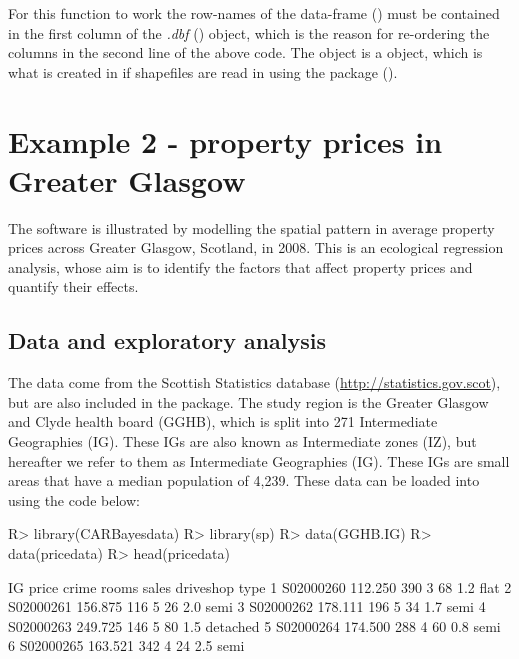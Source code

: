 \documentclass[article,shortnames,nojss]{jss}
\begin{document}
For this function to work the row-names of the data-frame () must be contained in the first column of the \emph{.dbf} () object, which is the reason for re-ordering the columns in the second line of the above code. The  object is a  object, which is what is created in  if shapefiles are read in using the   package (\citealp{rgdal}). 


\section{Example 2 - property prices in Greater Glasgow}
The  software is illustrated by modelling the spatial pattern in average property prices across Greater Glasgow, Scotland, in 2008. This is an ecological regression analysis, whose aim is to  identify the factors that affect property prices and quantify their effects.


\subsection{Data and exploratory analysis}
The data come from the Scottish Statistics database (\url{http://statistics.gov.scot}), but are also included in the   package. The study region is the Greater Glasgow and Clyde health board (GGHB), which is split into 271 Intermediate Geographies (IG). These IGs are also known as Intermediate zones (IZ), but hereafter we refer to them as Intermediate Geographies (IG). These IGs are small areas that have a median population of 4,239. These data can be loaded into  using the code below:
    
    
\begin{Schunk}
\begin{Sinput}
R> library(CARBayesdata)
R> library(sp)
R> data(GGHB.IG)
R> data(pricedata)
R> head(pricedata)
\end{Sinput}
\begin{Soutput}
         IG   price crime rooms sales driveshop     type
1 S02000260 112.250   390     3    68       1.2     flat
2 S02000261 156.875   116     5    26       2.0     semi
3 S02000262 178.111   196     5    34       1.7     semi
4 S02000263 249.725   146     5    80       1.5 detached
5 S02000264 174.500   288     4    60       0.8     semi
6 S02000265 163.521   342     4    24       2.5     semi
\end{Soutput}
\end{Schunk}
    
\end{document}
